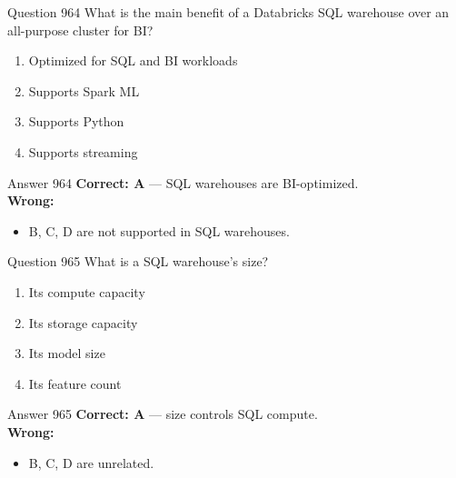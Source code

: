 \documentclass[aspectratio=169,11pt]{beamer}
\begin{document}
	\begin{frame}{Question 964}
		What is the main benefit of a Databricks SQL warehouse over an all-purpose cluster for BI?
		\begin{enumerate}[label=\Alph*.]
			\item Optimized for SQL and BI workloads
			\item Supports Spark ML
			\item Supports Python
			\item Supports streaming
		\end{enumerate}
	\end{frame}
	\begin{frame}{Answer 964}
		\textbf{Correct: A} --- SQL warehouses are BI-optimized.\\
		\vspace{0.5em}
		\textbf{Wrong:}
		\begin{itemize}
			\item B, C, D are not supported in SQL warehouses.
		\end{itemize}
	\end{frame}
	
	\begin{frame}{Question 965}
		What is a SQL warehouse's size?
		\begin{enumerate}[label=\Alph*.]
			\item Its compute capacity
			\item Its storage capacity
			\item Its model size
			\item Its feature count
		\end{enumerate}
	\end{frame}
	\begin{frame}{Answer 965}
		\textbf{Correct: A} --- size controls SQL compute.\\
		\vspace{0.5em}
		\textbf{Wrong:}
		\begin{itemize}
			\item B, C, D are unrelated.
		\end{itemize}
	\end{frame}
	
\end{document}
